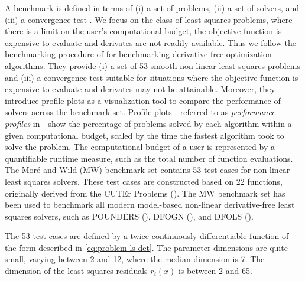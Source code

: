 \noindent A benchmark is defined in terms of (i) a set of problems, (ii) a set of solvers, and
(iii) a convergence test \cite{Dolan2002}. We focus on the class of least squares problems, where there is a limit on the user's computational budget, the objective function is expensive to evaluate and derivates are not readily available.
Thus we follow the benchmarking procedure of \cite{MoreWild2009} for benchmarking derivative-free optimization algorithms. They provide (i) a set of 53 smooth non-linear least squares problems and (iii) a convergence test suitable for situations where the objective function is expensive to evaluate and derivates may not be attainable.
Moreover, they introduce profile plots as a visualization tool to compare the performance of solvers across the benchmark set.
Profile plots - referred to as \textit{performance profiles} in \cite{MoreWild2009} - show the percentage of problems solved by each algorithm within a given computational budget, scaled by the time the fastest algorithm took to solve the problem. The computational budget of a user is represented by a quantifiable runtime measure, such as the total number of function evaluations.
The Moré and Wild (MW) benchmark set contains 53 test cases for non-linear least squares solvers.
These test cases are constructed based on 22 functions, originally derived from the CUTEr
Problems (\cite{Gould2003}). The MW benchmark set has been used to benchmark all modern model-based non-linear derivative-free least squares solvers, such as POUNDERS (\cite{Wild2015}), DFOGN (\cite{Cartis2017}), and DFOLS (\cite{Cartis2019}).


\noindent The 53 test cases are defined by a twice continuously differentiable function of the form described in \ref{eq:problem-ls-det}. The parameter dimensions are quite small, varying between 2 and 12, where the median dimension is 7.
The dimension of the least squares residuals $r_i(x)$ is between 2 and 65.

